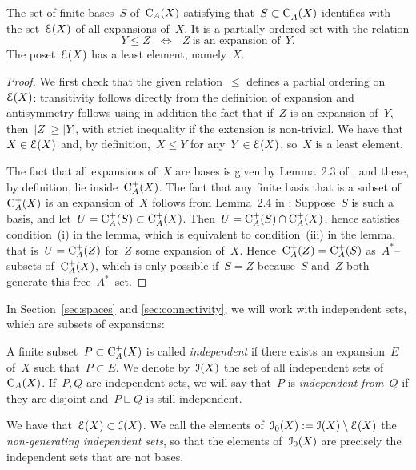 \begin{lem}\label{lem:expord}
The set of finite bases~$S$ of~$\mathrm{C}_A(X)$ satisfying that~$S\subset \mathrm{C}_A^+(X)$ identifies with the set~$\mathcal{E}(X)$ of all expansions of~$X$. It is a partially ordered set with the relation 
$$Y\le Z \ \ \ \Longleftrightarrow\ \ \  Z \ \textrm{is an expansion of}\ \ Y.$$  
The poset~$\mathcal{E}(X)$ has a least element, namely~$X$. 
\end{lem}


\begin{proof}
We first check that the given relation~$\le$ defines a partial ordering on~$\mathcal{E}(X)$: transitivity follows directly from the definition of expansion and antisymmetry follows using in addition the fact that if~$Z$ is an expansion of~$Y$, then~$|Z|\ge |Y|$, with strict inequality if the extension is non-trivial. We have that~$X\in \mathcal{E}(X)$ and, by definition,~$X\le Y$ for any~$Y\in \mathcal{E}(X)$, so~$X$ is a least element.  

The fact that all expansions of~$X$ are bases is given by Lemma~2.3 of \cite{Higman}, and these, by definition, lie inside~$\mathrm{C}_A^+(X)$. The fact that any finite basis that  is a subset of~$\mathrm{C}_A^+(X)$ is an expansion of~$X$ follows from Lemma~2.4 in \cite{Higman}: Suppose~$S$ is such a  basis, and let~\hbox{$U=\mathrm{C}_A^+(S)\subset\mathrm{C}_A^+(X)$}. Then~\hbox{$U=\mathrm{C}_A^+(S)\cap\mathrm{C}_A^+(X)$}, hence satisfies condition~(i) in the lemma, which is equivalent to condition~(iii) in the lemma, that is~\hbox{$U=\mathrm{C}_A^+(Z)$} for~$Z$ some expansion of~$X$. Hence~$\mathrm{C}_A^+(Z)=\mathrm{C}_A^+(S)$ as~$A^*$--subsets of~$\mathrm{C}_A^+(X)$, which is only possible if~$S=Z$ because~$S$ and~$Z$ both generate this free~$A^*$--set. 
\end{proof}


In Section~\ref{sec:spaces} and \ref{sec:connectivity}, we will work with independent sets, which are subsets of expansions: 


\begin{definition}\label{def:independent}
A finite subset~$P\subset \mathrm{C}_A^+(X)$ is called {\em independent} if there exists an expansion~$E$ of~$X$ such that~$P\subset E$. We denote by~$\mathcal{I}(X)$ the set of all independent sets of~$\mathrm{C}_A(X)$. 
If~$P,Q$ are independent sets, we will say that~$P$ is {\em independent from~$Q$} if they are disjoint and~$P\sqcup Q$ is still independent. 

We have that~$\mathcal{E}(X)\subset \mathcal{I}(X)$. We call the elements of~$\mathcal{I}_0(X):=\mathcal{I}(X)\setminus \mathcal{E}(X)$ the {\em non-generating independent sets}, so that the elements of~$\mathcal{I}_0(X)$ are precisely the independent sets that are not bases.
\end{definition} 

